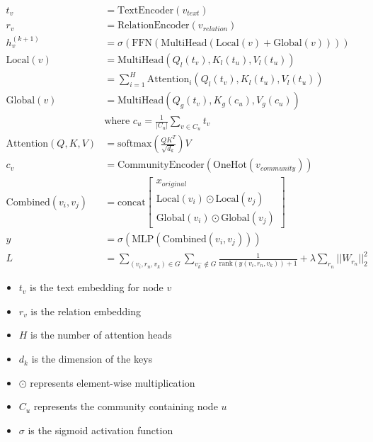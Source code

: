 \documentclass{article}
\begin{document}
\begin{align*}
t_v &= \text{TextEncoder}(v_{text}) \\[5pt]
r_v &= \text{RelationEncoder}(v_{relation}) \\[10pt]

h_v^{(k+1)} &= \sigma \left( \text{FFN}\left(\text{MultiHead}\left(\text{Local}(v) + \text{Global}(v)\right)\right) \right) \\[10pt]

\text{Local}(v) &= \text{MultiHead}(Q_l(t_v), K_l(t_u), V_l(t_u)) \\
&= \sum_{i=1}^H \text{Attention}_i(Q_l(t_v), K_l(t_u), V_l(t_u)) \\[10pt]

\text{Global}(v) &= \text{MultiHead}(Q_g(t_v), K_g(c_u), V_g(c_u)) \\
&\text{where } c_u = \frac{1}{|C_u|}\sum_{v \in C_u} t_v \\[10pt]

\text{Attention}(Q, K, V) &= \text{softmax}\left(\frac{QK^T}{\sqrt{d_k}}\right)V \\[10pt]

c_v &= \text{CommunityEncoder}(\text{OneHot}(v_{community})) \\[10pt]

\text{Combined}(v_i, v_j) &= \text{concat}\begin{bmatrix}
    x_{original} \\
    \text{Local}(v_i) \odot \text{Local}(v_j) \\
    \text{Global}(v_i) \odot \text{Global}(v_j)
\end{bmatrix} \\[10pt]

y &= \sigma(\text{MLP}(\text{Combined}(v_i, v_j))) \\[10pt]

L &= \sum_{(v_i, r_n, v_k) \in G} \sum_{v_k^- \notin G} \frac{1}{\text{rank}(y(v_i, r_n, v_k)) + 1} + \lambda \sum_{r_n} ||W_{r_n}||_2^2
\end{align*}

\begin{itemize}
\item $t_v$ is the text embedding for node $v$
\item $r_v$ is the relation embedding
\item $H$ is the number of attention heads
\item $d_k$ is the dimension of the keys
\item $\odot$ represents element-wise multiplication
\item $C_u$ represents the community containing node $u$
\item $\sigma$ is the sigmoid activation function
\end{itemize}
\end{document}
